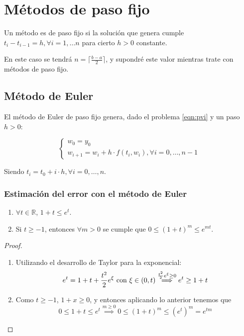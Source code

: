 \section{Métodos de paso fijo}

\begin{definition}  Un método es de paso fijo si la solución que genera cumple $t_i-t_{i-1}=h,\forall i=1,\dots n$ para cierto $h>0$ constante. \end{definition}

En este caso se tendrá $n=\lceil \frac{b-a}{2} \rceil$, y supondré este valor mientras trate con métodos de paso fijo.

\subsection{Método de Euler}
\begin{definition} 
    El método de Euler de paso fijo genera, dado el problema \ref{eqn:pvi} y un paso $h>0$:

\begin{equation} \label{eqn:eulersol}
\begin{cases}
    w_0=y_0 \\
    w_{i+1}=w_i + h\cdot f(t_i, w_i), \forall i=0,\dots, n-1
\end{cases}
\end{equation}

Siendo $t_i =t_0+i\cdot h,\forall i=0,\dots, n$.
\end{definition}

\subsubsection{Estimación del error con el método de Euler}

\begin{lemma}
\label{lema2}
\begin{enumerate}
    \item $\forall t \in \mathbb{R}$, $1+t \leq e^t$.
    \item Si $t\geq -1$, entonces $\forall m > 0$ se cumple que  $0\leq (1+t)^m \leq e^{mt}.$
\end{enumerate} 
\end{lemma}
\begin{proof}
\begin{enumerate}
    \item Utilizando el desarrollo de Taylor para la exponencial:
    $$
    e^t = 1+t+\frac{t^2}{2}e^{\xi} \textnormal{ con }\xi\in(0,t) \overset{\frac{t^2}{2}e^{\xi} \geq 0}{\implies} e^t \geq 1+t
    $$
    \item Como $t\geq -1$, $1+x \geq 0$, y entonces aplicando lo anterior tenemos que $$ 0\leq 1+t \leq e^t \overset{m\geq 0}{\implies} 0 \leq (1+t)^m \leq (e^t)^m = e^{tm} $$
\end{enumerate}
\end{proof}

